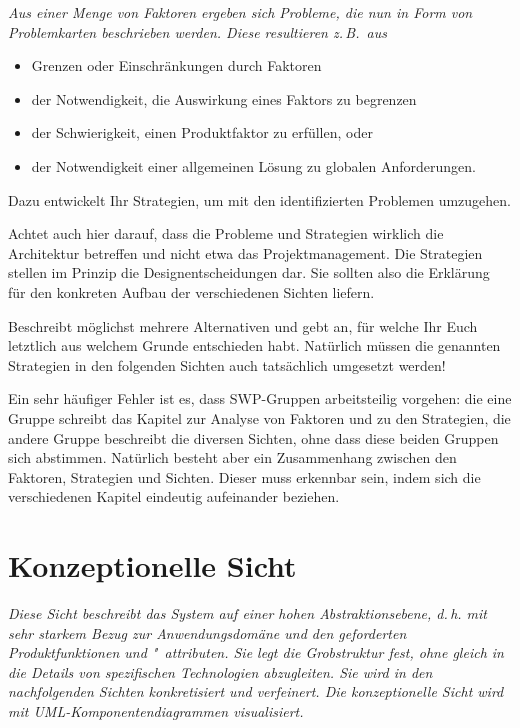 \documentclass[fontsize=12pt,paper=a4,twoside]{scrartcl}
\begin{document}
{\itshape Aus einer Menge von Faktoren ergeben sich Probleme, die nun in Form 
von Problemkarten beschrieben werden. Diese resultieren z.\,B.\ aus
\begin{itemize}
  \item Grenzen oder Einschränkungen durch Faktoren
  \item der Notwendigkeit, die Auswirkung eines Faktors zu begrenzen
  \item der Schwierigkeit, einen Produktfaktor zu erfüllen, oder
  \item der Notwendigkeit einer allgemeinen Lösung zu globalen Anforderungen.
\end{itemize}
Dazu entwickelt Ihr Strategien, um mit den identifizierten Problemen umzugehen.

Achtet auch hier darauf, dass die Probleme und Strategien wirklich die 
Architektur betreffen und nicht etwa das Projektmanagement. Die Strategien 
stellen im Prinzip die Designentscheidungen dar. Sie sollten also die Erklärung 
für den konkreten Aufbau der verschiedenen Sichten liefern.

Beschreibt möglichst mehrere Alternativen und gebt an, für welche Ihr Euch 
letztlich aus welchem Grunde entschieden habt. Natürlich müssen die genannten 
Strategien in den folgenden Sichten auch tatsächlich umgesetzt werden!

Ein sehr häufiger Fehler ist es, dass SWP-Gruppen arbeitsteilig vorgehen: die 
eine Gruppe schreibt das Kapitel zur Analyse von Faktoren und zu den Strategien, 
die andere Gruppe beschreibt die diversen Sichten, ohne dass diese beiden 
Gruppen sich abstimmen. Natürlich besteht aber ein Zusammenhang zwischen den
Faktoren, Strategien und Sichten. Dieser muss erkennbar sein, indem sich die 
verschiedenen Kapitel eindeutig aufeinander beziehen.}


\section{Konzeptionelle Sicht} \label{sec:konzeptionell}

{\itshape Diese Sicht beschreibt das System auf einer hohen Abstraktionsebene,
d.\,h. mit sehr starkem Bezug zur Anwendungsdomäne und den geforderten
Produktfunktionen und "~attributen. Sie legt die Grobstruktur fest, ohne gleich 
in die Details von spezifischen Technologien abzugleiten. Sie wird in den 
nachfolgenden Sichten konkretisiert und verfeinert. Die konzeptionelle Sicht 
wird mit {UML}-Komponentendiagrammen visualisiert.}
\end{document}
